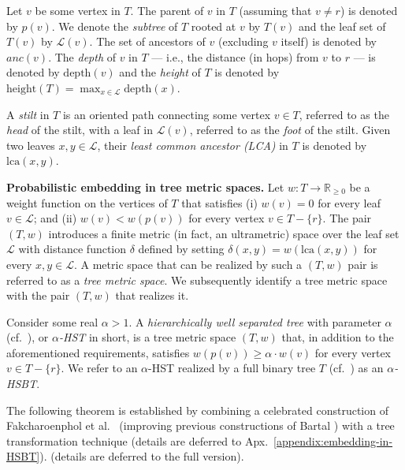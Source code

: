 \documentclass[11pt]{article}
\def\LongVersion{}
\def\LongVersionEnd{}
\def\ShortVersion{}
\def\ShortVersionEnd{}
\renewcommand{\paragraph}[1]{\par\noindent\textbf{#1}}
\theoremstyle{definition}
\theoremstyle{plain}
\theoremstyle{definition}
\theoremstyle{plain}
\theoremstyle{definition}
\theoremstyle{plain}
\newcommand{\NotationLabel}[1]{\label{notationTable:#1}\ignorespaces}
\newcommand{\Appendix}{Apx.}
\newcommand{\Reals}{\mathbb{R}}
\newcommand{\Leaves}{\mathcal{L}}
\newcommand{\LCA}{\mathrm{lca}}
\newcommand{\Depth}{\mathrm{depth}}
\newcommand{\Height}{\mathrm{height}}
\newcommand{\Ancestors}{\mathit{anc}}
\begin{document}
Let $v$ be some vertex in $T$.
The parent of $v$ in $T$ (assuming that $v \neq r$) is denoted by
$p(v)$.
\NotationLabel{tree:parent}
We denote the \emph{subtree} of $T$ rooted at $v$ by $T(v)$
\NotationLabel{tree:subtree}
and the leaf set of $T(v)$ by $\Leaves(v)$.
\NotationLabel{tree:subtree-leaves}
The set of ancestors of $v$ (excluding $v$ itself) is denoted by
$\Ancestors(v)$.
\NotationLabel{tree:ancestors}
The \emph{depth} of $v$ in $T$ --- i.e., the distance (in hops) from $v$ to
$r$ --- is denoted by
$\Depth(v)$
\NotationLabel{tree:depth}
and the \emph{height} of $T$ is denoted by
$\Height(T) = \max_{x \in \Leaves} \Depth(x)$.
\NotationLabel{tree:height}

A \emph{stilt} in $T$ is an oriented path connecting some vertex $v \in T$,
referred to as the \emph{head} of the stilt, with a leaf in $\Leaves(v)$,
referred to as the \emph{foot} of the stilt.
Given two leaves $x, y \in \Leaves$, their \emph{least common ancestor (LCA)}
in $T$ is denoted by
$\LCA(x, y)$.
\NotationLabel{tree-lca}

\paragraph{Probabilistic embedding in tree metric spaces.}
Let
$w : T \rightarrow \Reals_{\geq 0}$
be a weight function on the vertices of $T$ that satisfies
(i) $w(v) = 0$ for every leaf $v \in \Leaves$; and
(ii) $w(v) < w(p(v))$
for every vertex
$v \in T - \{ r \}$.
The pair
$(T, w)$
introduces a finite metric (in fact, an ultrametric) space over the leaf set
$\Leaves$ with distance function $\delta$ defined by setting
$\delta(x, y) = w(\LCA(x, y))$
for every $x, y \in \Leaves$.
A metric space that can be realized by such a $(T, w)$ pair is referred to as
a \emph{tree metric space}.
We subsequently identify a tree metric space with the pair $(T, w)$ that
realizes it.

Consider some real $\alpha > 1$.
A \emph{hierarchically well separated tree} with parameter $\alpha$
(cf.\ \cite{Bartal1996}), or \emph{$\alpha$-HST} in short, is a tree metric
space $(T, w)$ that, in addition to the aforementioned
requirements, satisfies
$w(p(v)) \geq \alpha \cdot w(v)$
for every vertex
$v \in T - \{ r \}$.
We refer to an $\alpha$-HST realized by a full binary tree $T$ (cf.\
\cite{CoteMP2008}) as an \emph{$\alpha$-HSBT}.

The following theorem is established by combining a celebrated construction of
Fakcharoenphol et al.~\cite{FakcharoenpholRT2004} (improving previous
constructions of Bartal \cite{Bartal1996,Bartal1998}) with a tree
transformation technique \cite{PattShamir2015}
\LongVersion %
(details are deferred to \Appendix{}~\ref{appendix:embedding-in-HSBT}).
\LongVersionEnd %
%
\ShortVersion %
(details are deferred to the full version).
\ShortVersionEnd %
\end{document}
